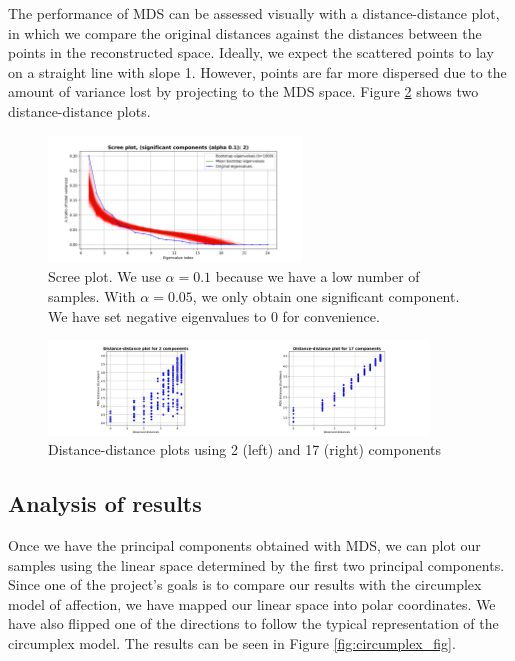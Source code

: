 \documentclass[11pt, a4paper]{article}
\numberwithin{equation}{subsection}
\begin{document}
The performance of MDS can be assessed visually with a distance-distance plot, in which we compare the original distances against the distances between the points in the reconstructed space. Ideally, we expect the scattered points to lay on a straight line with slope 1. However, points are far more dispersed due to the amount of variance lost by projecting to the MDS space. Figure \ref{fig:dist_dist} shows two distance-distance plots.

\begin{figure}
    \centering
    \includegraphics[width=0.6\textwidth]{images/scree_plot.png}
    \caption{Scree plot. We use $\alpha=0.1$ because we have a low number of samples. With $\alpha=0.05$, we only obtain one significant component. We have set negative eigenvalues to 0 for convenience. }
    \label{fig:scree_plot}
\end{figure}


\begin{figure}[ht]
    \centering
    \includegraphics[width=0.9\textwidth]{images/two_dist_dist_plot.png}
    \caption{Distance-distance plots using 2 (left) and 17 (right) components}
    \label{fig:dist_dist}
\end{figure}


\subsection{Analysis of results}

Once we have the principal components obtained with MDS, we can plot our samples using the linear space determined by the first two principal components. Since one of the project's goals is to compare our results with the circumplex model of affection, we have mapped our linear space into polar coordinates. We have also flipped one of the directions to follow the typical representation of the circumplex model. The results can be seen in Figure \ref{fig:circumplex_fig}.
\end{document}
